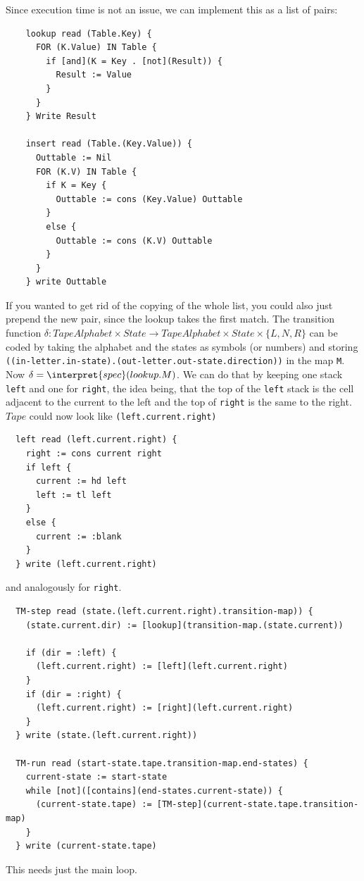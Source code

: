 \begin{Answer}
	\Question Since execution time is not an issue, we can implement this as a 
	list of pairs:

\begin{verbatim}
    lookup read (Table.Key) {
      FOR (K.Value) IN Table {
        if [and](K = Key . [not](Result)) {
          Result := Value
        }
      }
    } Write Result

    insert read (Table.(Key.Value)) {
      Outtable := Nil
      FOR (K.V) IN Table {
        if K = Key {
          Outtable := cons (Key.Value) Outtable
        }
        else {
          Outtable := cons (K.V) Outtable
        }
      }
    } write Outtable
\end{verbatim}

If you wanted to get rid of the copying of the whole list, you could also 
just prepend the new pair, since the lookup takes the first match.
	\Question The transition function 
	$\delta: TapeAlphabet \times State \rightarrow TapeAlphabet \times State\times \{L,N,R\}$
	can be coded by taking the alphabet and the states as symbols (or numbers) 
	and storing {\tt ((in-letter.in-state).(out-letter.out-state.direction))} 
	in the map {\tt M}. Now $\delta = \interpret{spec}(lookup.M)$.
	\Question
		\subQuestion We can do that by keeping one stack {\tt left} and one for 
		{\tt right}, the idea being, that the top of the {\tt left} stack is the 
		cell adjacent to the current to the left and the top of {\tt right} is 
		the same to the right. $Tape$ could now look like {\tt (left.current.right)}
		\subQuestion 
\begin{verbatim}
  left read (left.current.right) {
    right := cons current right
    if left {
      current := hd left
      left := tl left
    }
    else {
      current := :blank
    }
  } write (left.current.right)
\end{verbatim}
and analogously for {\tt right}.
	\Question
\begin{verbatim}
  TM-step read (state.(left.current.right).transition-map)) {
    (state.current.dir) := [lookup](transition-map.(state.current))

    if (dir = :left) {
      (left.current.right) := [left](left.current.right)
    }
    if (dir = :right) {
      (left.current.right) := [right](left.current.right)
    }
  } write (state.(left.current.right))

  TM-run read (start-state.tape.transition-map.end-states) {
    current-state := start-state
    while [not]([contains](end-states.current-state)) {
      (current-state.tape) := [TM-step](current-state.tape.transition-map)
    }
  } write (current-state.tape)
\end{verbatim}
	This needs just the main loop.
\end{Answer}

